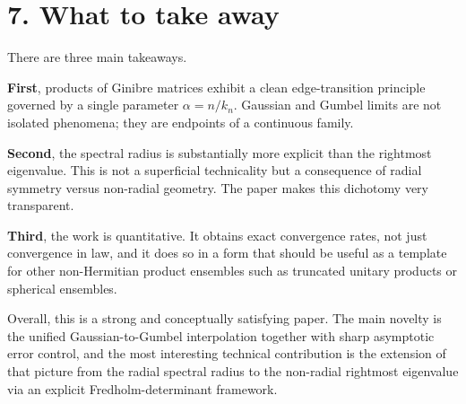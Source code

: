 \documentclass[11pt]{article}
\begin{document}
\section*{7. What to take away}
There are three main takeaways.

\textbf{First}, products of Ginibre matrices exhibit a clean edge-transition principle governed by a single parameter $\alpha=n/k_n$. Gaussian and Gumbel limits are not isolated phenomena; they are endpoints of a continuous family.

\textbf{Second}, the spectral radius is substantially more explicit than the rightmost eigenvalue. This is not a superficial technicality but a consequence of radial symmetry versus non-radial geometry. The paper makes this dichotomy very transparent.

\textbf{Third}, the work is quantitative. It obtains exact convergence rates, not just convergence in law, and it does so in a form that should be useful as a template for other non-Hermitian product ensembles such as truncated unitary products or spherical ensembles.

Overall, this is a strong and conceptually satisfying paper. The main novelty is the unified Gaussian-to-Gumbel interpolation together with sharp asymptotic error control, and the most interesting technical contribution is the extension of that picture from the radial spectral radius to the non-radial rightmost eigenvalue via an explicit Fredholm-determinant framework.
\end{document}
